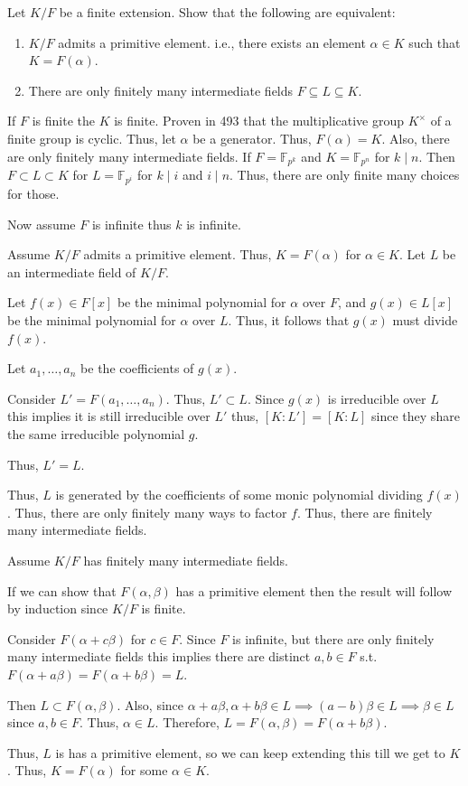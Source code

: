\documentclass[12pt, letterpaper]{article}
\newcommand{\F}{\mathbb{F}}
\begin{document}
\begin{problem}{}
    Let $K/F$ be a finite extension. Show that the following are equivalent:
\begin{enumerate}
\item $K/F$ admits a primitive element. i.e., there exists an element $\alpha\in K$ such that $K=F(\alpha)$. 
\item There are only finitely many intermediate fields $F \subseteq L \subseteq K$. 
\end{enumerate}
\end{problem}
\begin{problemproof}
    If $F$ is finite the $K$ is finite. Proven in 493 that the multiplicative group $K^\times$ of a finite group is cyclic. Thus, let $\alpha$ be a generator. Thus, $F(\alpha)=K$. Also, there are only finitely many intermediate fields. If $F=\F_{p^k}$ and $K=\F_{p^n}$ for $k \mid n$. Then $F \subset L \subset K$ for $L=\F_{p^i}$ for $k \mid i$ and $i \mid n$. Thus, there are only finite many choices for those.

    Now assume $F$ is infinite thus $k$ is infinite.

    Assume $K/F$ admits a primitive element. Thus, $K=F(\alpha)$ for $\alpha \in K$. Let $L$ be an intermediate field of $K/F$.

    Let $f(x) \in F[x]$ be the minimal polynomial for $\alpha$ over $F$, and $g(x) \in L[x]$ be the minimal polynomial for $\alpha$ over $L$. Thus, it follows that $g(x)$ must divide $f(x)$.

    Let $a_1,\dots,a_n$ be the coefficients of $g(x)$.

    Consider $L'=F(a_1,\dots,a_n)$. Thus, $L' \subset L$. Since $g(x)$ is irreducible over $L$ this implies it is still irreducible over $L'$ thus, $[K:L']=[K:L]$ since they share the same irreducible polynomial $g$.

    Thus, $L'=L$.

    Thus, $L$ is generated by the coefficients of some monic polynomial dividing $f(x)$. Thus, there are only finitely many ways to factor $f$. Thus, there are finitely many intermediate fields.

    Assume $K/F$ has finitely many intermediate fields.

    If we can show that $F(\alpha,\beta)$ has a primitive element then the result will follow by induction since $K/F$ is finite.

    Consider $F(\alpha + c\beta)$ for $c \in F$. Since $F$ is infinite, but there are only finitely many intermediate fields this implies there are distinct $a,b \in F$ s.t. $F(\alpha + a\beta)=F(\alpha+ b\beta)=L$.

    Then $L \subset F(\alpha,\beta)$. Also, since $\alpha + a\beta, \alpha + b\beta \in L \implies (a-b)\beta \in L \implies \beta \in L$ since $a,b \in F$. Thus, $\alpha \in L$. Therefore, $L=F(\alpha,\beta)=F(\alpha + b\beta)$.

    Thus, $L$ is has a primitive element, so we can keep extending this till we get to $K$. Thus, $K=F(\alpha)$ for some $\alpha \in K$.
\end{problemproof}
\end{document}
